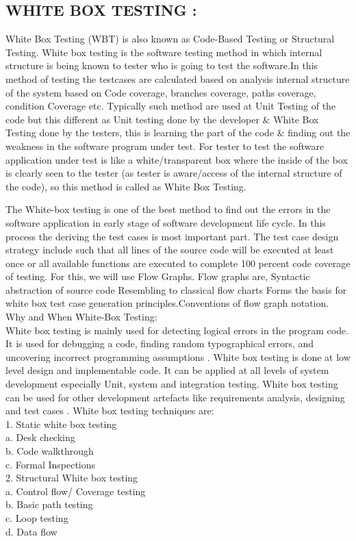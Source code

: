 \documentclass[a4paper,12pt]{article}
\begin{document}
{{\subsection{WHITE BOX TESTING :}
		 White Box Testing (WBT) is also known as Code-Based Testing or Structural Testing. White box testing is the software testing method in which internal structure is being known to tester who is going to test the software.In this method of testing the testcases are calculated based on analysis internal structure of the system based on Code coverage, branches coverage, paths coverage, condition Coverage etc. Typically such method are used at Unit Testing of the code but this different as Unit testing done by the developer \& White Box Testing done by the testers, this is learning the part of the code \& finding out the weakness in the software program under test.
For tester to test the software application under test is like a white/transparent box where the inside of the box is clearly seen to the tester (as tester is aware/access of the internal structure of the code), so this method is called as White Box Testing.

The White-box testing is one of the best method to find out the errors in the software application in early stage of software development life cycle. In this process the deriving the test cases is most important part. The test case design strategy include such that all lines of the source code will be executed at least once or all available functions are executed to complete 100 percent  code coverage of testing. For this, we will use Flow Graphs. Flow graphs are, Syntactic abstraction of source code Resembling to classical flow charts Forms the basis for white box test case generation principles.Conventions of flow graph notation. \\
Why and When White-Box Testing:\\
White box testing is mainly used for detecting logical errors in the program code. It is used for
debugging a code, finding random typographical errors, and uncovering incorrect programming
assumptions .
White box testing is done at low level design and implementable code. It can be applied at all levels of
system development especially Unit, system and integration testing. White box testing can be used for
other development artefacts like requirements analysis, designing and test cases .
White box testing techniques are:\\
1. Static white box testing\\
a. Desk checking\\
b. Code walkthrough\\
c. Formal Inspections\\
2. Structural White box testing\\
a. Control flow/ Coverage testing\\
b. Basic path testing\\
c. Loop testing\\
d. Data flow \\


}}
\end{document}
